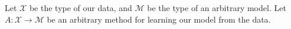 \documentclass{article}
\theoremstyle{definition}
\begin{document}
Let $\mathcal{X}$ be the type of our data,
and $\mathcal{M}$ be the type of an arbitrary model.
Let $A : \mathcal{X} \to \mathcal{M}$ be an arbitrary method for learning our model from the data.



\end{document}
